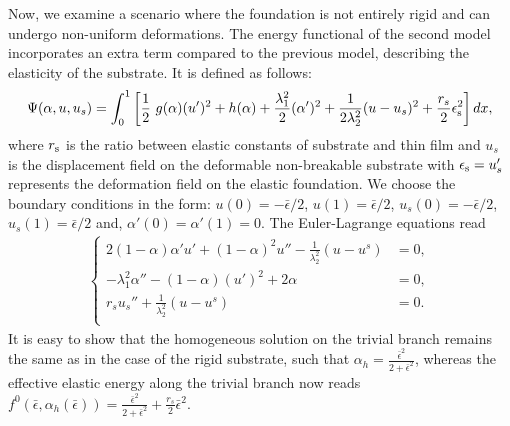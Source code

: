 Now, we examine a scenario where the foundation is not entirely rigid and can undergo non-uniform deformations. The energy functional of the second model incorporates an extra term compared to the previous model, describing the elasticity of the substrate. It is defined as follows:
\begin{equation}
\label{model_elastic_substrate}
\Psi(\alpha, u,u_s) = \int_{0}^1 \left[ \frac{1}{2} \ g(\alpha)(u')^2 + h(\alpha) + \frac{\lambda_1^2}{2}(\alpha')^2 
+ \frac{1}{2 \lambda_2^2} (u-u_s)^2 
+ \frac{r_{s}}{2}  \epsilon_{\rm s}^2 \right] dx,
\end{equation}
where $r_{\rm s}$ is the ratio between elastic constants of substrate and thin film and $u_s$ is the displacement field on the deformable non-breakable substrate with $\epsilon_{\rm s}=u_s'$ represents the deformation field on the elastic foundation. We  choose the boundary conditions in the form: $u(0)=-\bar\epsilon/2$, $u(1)=\bar\epsilon/2$,  $u_s(0)=-\bar\epsilon/2$, $u_s(1)=\bar\epsilon/2$ and, $\alpha'(0)=\alpha'(1)=0$.  The Euler-Lagrange equations read
\begin{eqnarray}\label{modeld_el_1}
\begin{cases}
  2(1-\alpha)\alpha' u' +(1-\alpha)^2 u'' -  \frac{1}{\lambda_2^2}(u-u^s) &= 0, \\
  -\lambda_1^2\alpha'' - (1-\alpha)( u')^2 + 2\alpha   &= 0,\\
    r_su_s''  +  \frac{1}{\lambda_2^2}(u-u^s) &= 0. \\
\end{cases}
\label{auto2}
\end{eqnarray}
It is easy to show that the homogeneous solution on the trivial branch remains the same as in the case of the rigid substrate, such that $\alpha_h = \frac{\bar{\epsilon}^2}{2 + \bar{\epsilon}^2}\label{eq:homo11}$, whereas the effective elastic energy along the trivial branch now reads $f^0(\bar{\epsilon}, \alpha_h(\bar{\epsilon})) = \frac{\bar{\epsilon}^2}{2 + \bar{\epsilon}^2} + \frac{r_s}{2}\bar{\epsilon}^2$. 

